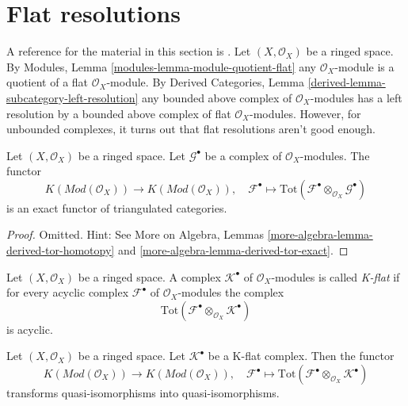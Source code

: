 









\section{Flat resolutions}
\label{section-flat}

\noindent
A reference for the material in this section is \cite{Spaltenstein}.
Let $(X, \mathcal{O}_X)$ be a ringed space. By
Modules, Lemma \ref{modules-lemma-module-quotient-flat}
any $\mathcal{O}_X$-module is a quotient of a flat $\mathcal{O}_X$-module.
By
Derived Categories, Lemma \ref{derived-lemma-subcategory-left-resolution}
any bounded above complex of $\mathcal{O}_X$-modules has a left
resolution by a bounded above complex of flat $\mathcal{O}_X$-modules.
However, for unbounded complexes, it turns out that flat resolutions
aren't good enough.

\begin{lemma}
\label{lemma-derived-tor-exact}
Let $(X, \mathcal{O}_X)$ be a ringed space.
Let $\mathcal{G}^\bullet$ be a complex of $\mathcal{O}_X$-modules.
The functor
$$
K(\textit{Mod}(\mathcal{O}_X))
\longrightarrow
K(\textit{Mod}(\mathcal{O}_X)),
\quad
\mathcal{F}^\bullet \longmapsto
\text{Tot}(\mathcal{F}^\bullet \otimes_{\mathcal{O}_X} \mathcal{G}^\bullet)
$$
is an exact functor of triangulated categories.
\end{lemma}

\begin{proof}
Omitted. Hint: See
More on Algebra, Lemmas \ref{more-algebra-lemma-derived-tor-homotopy} and
\ref{more-algebra-lemma-derived-tor-exact}.
\end{proof}

\begin{definition}
\label{definition-K-flat}
Let $(X, \mathcal{O}_X)$ be a ringed space.
A complex $\mathcal{K}^\bullet$ of $\mathcal{O}_X$-modules is
called {\it K-flat} if for every acyclic complex $\mathcal{F}^\bullet$
of $\mathcal{O}_X$-modules the complex
$$
\text{Tot}(\mathcal{F}^\bullet \otimes_{\mathcal{O}_X} \mathcal{K}^\bullet)
$$
is acyclic.
\end{definition}

\begin{lemma}
\label{lemma-K-flat-quasi-isomorphism}
Let $(X, \mathcal{O}_X)$ be a ringed space.
Let $\mathcal{K}^\bullet$ be a K-flat complex.
Then the functor
$$
K(\textit{Mod}(\mathcal{O}_X))
\longrightarrow
K(\textit{Mod}(\mathcal{O}_X)), \quad
\mathcal{F}^\bullet
\longmapsto
\text{Tot}(\mathcal{F}^\bullet \otimes_{\mathcal{O}_X} \mathcal{K}^\bullet)
$$
transforms quasi-isomorphisms into quasi-isomorphisms.
\end{lemma}

